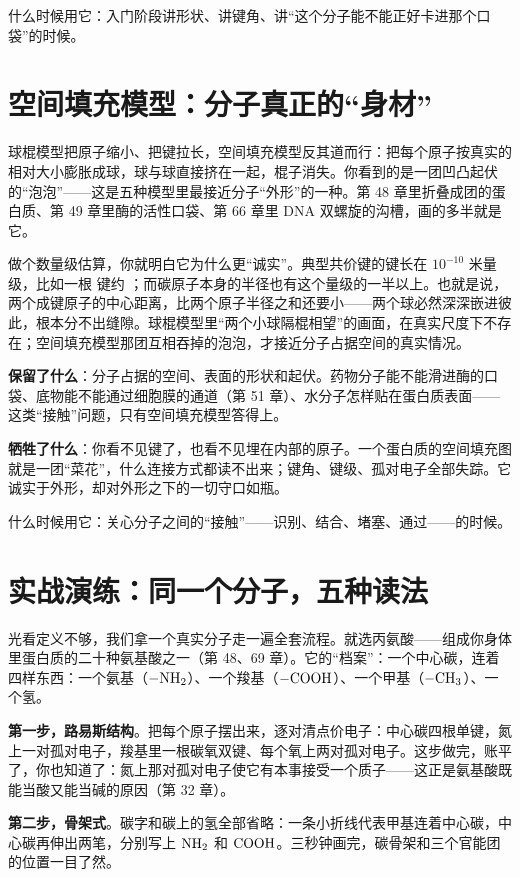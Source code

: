 什么时候用它：入门阶段讲形状、讲键角、讲“这个分子能不能正好卡进那个口袋”的时候。

\section{空间填充模型：分子真正的“身材”}

球棍模型把原子缩小、把键拉长，空间填充模型反其道而行：把每个原子按真实的相对大小膨胀成球，球与球直接挤在一起，棍子消失。你看到的是一团凹凸起伏的“泡泡”——这是五种模型里最接近分子“外形”的一种。第 48 章里折叠成团的蛋白质、第 49 章里酶的活性口袋、第 66 章里 DNA 双螺旋的沟槽，画的多半就是它。

做个数量级估算，你就明白它为什么更“诚实”。典型共价键的键长在 $10^{-10}$ 米量级，比如一根  键约 ；而碳原子本身的半径也有这个量级的一半以上。也就是说，两个成键原子的中心距离，比两个原子半径之和还要小——两个球必然深深嵌进彼此，根本分不出缝隙。球棍模型里“两个小球隔棍相望”的画面，在真实尺度下不存在；空间填充模型那团互相吞掉的泡泡，才接近分子占据空间的真实情况。

\textbf{保留了什么}：分子占据的空间、表面的形状和起伏。药物分子能不能滑进酶的口袋、底物能不能通过细胞膜的通道（第 51 章）、水分子怎样贴在蛋白质表面——这类“接触”问题，只有空间填充模型答得上。

\textbf{牺牲了什么}：你看不见键了，也看不见埋在内部的原子。一个蛋白质的空间填充图就是一团“菜花”，什么连接方式都读不出来；键角、键级、孤对电子全部失踪。它诚实于外形，却对外形之下的一切守口如瓶。

什么时候用它：关心分子之间的“接触”——识别、结合、堵塞、通过——的时候。

\section{实战演练：同一个分子，五种读法}

光看定义不够，我们拿一个真实分子走一遍全套流程。就选丙氨酸——组成你身体里蛋白质的二十种氨基酸之一（第 48、69 章）。它的“档案”：一个中心碳，连着四样东西：一个氨基（$-\mathrm{NH_2}$）、一个羧基（$-\mathrm{COOH}$）、一个甲基（$-\mathrm{CH_3}$）、一个氢。

\textbf{第一步，路易斯结构}。把每个原子摆出来，逐对清点价电子：中心碳四根单键，氮上一对孤对电子，羧基里一根碳氧双键、每个氧上两对孤对电子。这步做完，账平了，你也知道了：氮上那对孤对电子使它有本事接受一个质子——这正是氨基酸既能当酸又能当碱的原因（第 32 章）。

\textbf{第二步，骨架式}。碳字和碳上的氢全部省略：一条小折线代表甲基连着中心碳，中心碳再伸出两笔，分别写上 $\mathrm{NH_2}$ 和 $\mathrm{COOH}$。三秒钟画完，碳骨架和三个官能团的位置一目了然。

